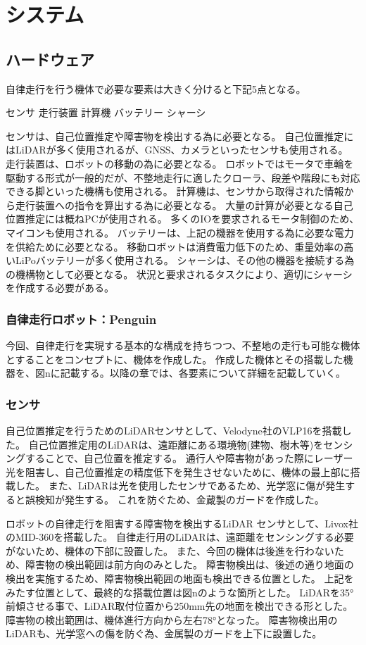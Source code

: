 \section{システム}


\subsection{ハードウェア}
自律走行を行う機体で必要な要素は大きく分けると下記5点となる。

センサ
走行装置
計算機
バッテリー
シャーシ

センサは、自己位置推定や障害物を検出する為に必要となる。
自己位置推定にはLiDARが多く使用されるが、GNSS、カメラといったセンサも使用される。 
走行装置は、ロボットの移動の為に必要となる。
ロボットではモータで車輪を駆動する形式が一般的だが、不整地走行に適したクローラ、段差や階段にも対応できる脚といった機構も使用される。 
計算機は、センサから取得された情報から走行装置への指令を算出する為に必要となる。
大量の計算が必要となる自己位置推定には概ねPCが使用される。
多くのIOを要求されるモータ制御のため、マイコンも使用される。 
バッテリーは、上記の機器を使用する為に必要な電力を供給ために必要となる。
移動ロボットは消費電力低下のため、重量効率の高いLiPoバッテリーが多く使用される。 
シャーシは、その他の機器を接続する為の機構物として必要となる。
状況と要求されるタスクにより、適切にシャーシを作成する必要がある。

\subsubsection{自律走行ロボット：Penguin}
今回、自律走行を実現する基本的な構成を持ちつつ、不整地の走行も可能な機体とすることをコンセプトに、機体を作成した。 
作成した機体とその搭載した機器を、図nに記載する。以降の章では、各要素について詳細を記載していく。

\subsubsection{センサ}
自己位置推定を行うためのLiDARセンサとして、Velodyne社のVLP16を搭載した。
自己位置推定用のLiDARは、遠距離にある環境物(建物、樹木等)をセンシングすることで、自己位置を推定する。
通行人や障害物があった際にレーザー光を阻害し、自己位置推定の精度低下を発生させないために、機体の最上部に搭載した。
また、LiDARは光を使用したセンサであるため、光学窓に傷が発生すると誤検知が発生する。
これを防ぐため、金蔵製のガードを作成した。

ロボットの自律走行を阻害する障害物を検出するLiDAR センサとして、Livox社のMID-360を搭載した。
自律走行用のLiDARは、遠距離をセンシングする必要がないため、機体の下部に設置した。
また、今回の機体は後進を行わないため、障害物の検出範囲は前方向のみとした。
障害物検出は、後述の通り地面の検出を実施するため、障害物検出範囲の地面も検出できる位置とした。
上記をみたす位置として、最終的な搭載位置は図nのような箇所とした。
LiDARを35°前傾させる事で、LiDAR取付位置から250mm先の地面を検出できる形とした。
障害物の検出範囲は、機体進行方向から左右78°となった。
障害物検出用のLiDARも、光学窓への傷を防ぐ為、金属製のガードを上下に設置した。

